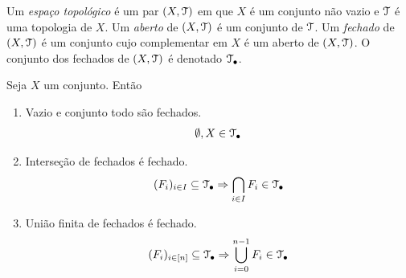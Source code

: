 \begin{definition}
	Um \emph{espaço topológico} é um par $(X,\mathcal{T})$ em que $X$ é um conjunto não vazio e $\mathcal{T}$ é uma topologia de $X$. Um \emph{aberto} de $(X,\mathcal{T})$ é um conjunto de $\mathcal{T}$. Um \emph{fechado} de $(X,\mathcal{T})$ é um conjunto cujo complementar em $X$ é um aberto de $(X,\mathcal{T})$. O conjunto dos fechados de $(X,\mathcal{T})$ é denotado $\mathcal{T}_{\bullet}$.
\end{definition}

\begin{proposition}
	Seja $X$ um conjunto. Então
	\begin{enumerate}
	\item Vazio e conjunto todo são fechados.
	\begin{equation*}
	\emptyset, X \in \mathcal{T}_{\bullet}
	\end{equation*}

	\item Interseção de fechados é fechado.
	\begin{equation*}
	(F_i)_{i \in I} \subseteq \mathcal{T}_{\bullet} \Rightarrow \bigcap_{i \in I} F_i  \in \mathcal{T}_{\bullet}
	\end{equation*}
	
	\item União finita de fechados é fechado.
	\begin{equation*}
	(F_i)_{i \in [n]} \subseteq \mathcal{T}_{\bullet} \Rightarrow \bigcup_{i=0}^{n-1} F_i \in \mathcal{T}_{\bullet}
	\end{equation*}
	

	\end{enumerate}
\end{proposition}
